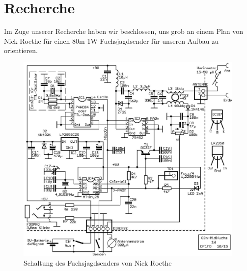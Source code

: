 \section{Recherche}

Im Zuge unserer Recherche haben wir beschlossen, uns grob an einem Plan von Nick Roethe für einen \glqq{}80m-1W-Fuchsjagdsender\grqq{} für unseren Aufbau zu orientieren.\\
\begin{figure}[H]
	\centering
	\includegraphics[width=16cm]{res/Recherche_Aufbau.png}
	\caption{Schaltung des Fuchsjagdsenders von Nick Roethe}
\end{figure}

